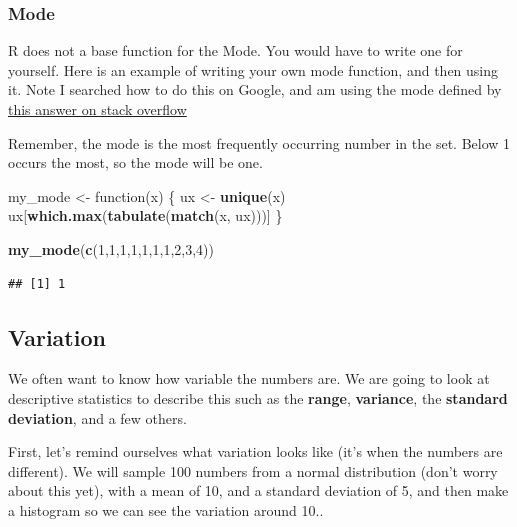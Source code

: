 \documentclass[]{book}
\newenvironment{Shaded}{\begin{snugshade}}{\end{snugshade}}
\newcommand{\KeywordTok}[1]{\textcolor[rgb]{0.13,0.29,0.53}{\textbf{{#1}}}}
\newcommand{\DecValTok}[1]{\textcolor[rgb]{0.00,0.00,0.81}{{#1}}}
\newcommand{\StringTok}[1]{\textcolor[rgb]{0.31,0.60,0.02}{{#1}}}
\newcommand{\NormalTok}[1]{{#1}}
\theoremstyle{definition}
\theoremstyle{definition}
\theoremstyle{definition}
\theoremstyle{remark}
\begin{document}
\subsubsection{Mode}\label{mode}

R does not a base function for the Mode. You would have to write one for
yourself. Here is an example of writing your own mode function, and then
using it. Note I searched how to do this on Google, and am using the
mode defined by
\href{https://stackoverflow.com/questions/2547402/is-there-a-built-in-function-for-finding-the-mode}{this
answer on stack overflow}

Remember, the mode is the most frequently occurring number in the set.
Below 1 occurs the most, so the mode will be one.

\begin{Shaded}
\begin{Highlighting}[]
\NormalTok{my_mode <-}\StringTok{ }\NormalTok{function(x) \{}
  \NormalTok{ux <-}\StringTok{ }\KeywordTok{unique}\NormalTok{(x)}
  \NormalTok{ux[}\KeywordTok{which.max}\NormalTok{(}\KeywordTok{tabulate}\NormalTok{(}\KeywordTok{match}\NormalTok{(x, ux)))]}
\NormalTok{\}}

\KeywordTok{my_mode}\NormalTok{(}\KeywordTok{c}\NormalTok{(}\DecValTok{1}\NormalTok{,}\DecValTok{1}\NormalTok{,}\DecValTok{1}\NormalTok{,}\DecValTok{1}\NormalTok{,}\DecValTok{1}\NormalTok{,}\DecValTok{1}\NormalTok{,}\DecValTok{1}\NormalTok{,}\DecValTok{2}\NormalTok{,}\DecValTok{3}\NormalTok{,}\DecValTok{4}\NormalTok{))}
\end{Highlighting}
\end{Shaded}

\begin{verbatim}
## [1] 1
\end{verbatim}

\subsection{Variation}\label{variation}

We often want to know how variable the numbers are. We are going to look
at descriptive statistics to describe this such as the \textbf{range},
\textbf{variance}, the \textbf{standard deviation}, and a few others.

First, let's remind ourselves what variation looks like (it's when the
numbers are different). We will sample 100 numbers from a normal
distribution (don't worry about this yet), with a mean of 10, and a
standard deviation of 5, and then make a histogram so we can see the
variation around 10..
\end{document}
